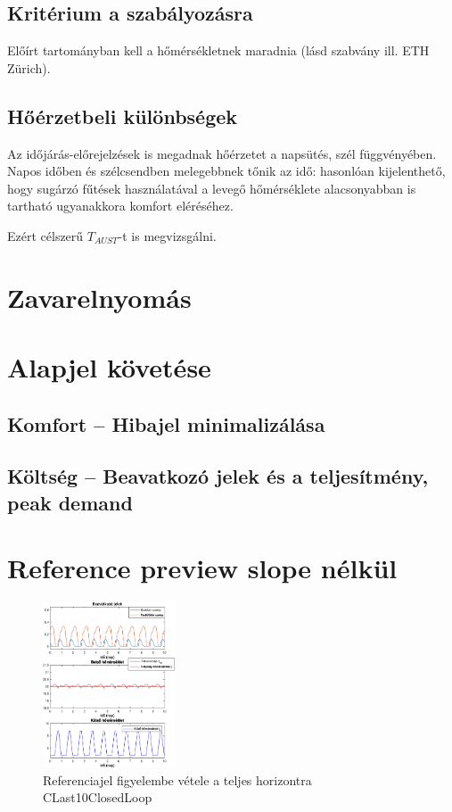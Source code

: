 \subsection{Kritérium a szabályozásra}
Előírt tartományban kell a hőmérsékletnek maradnia (lásd szabvány ill. ETH Zürich).

\subsection{Hőérzetbeli különbségek}
Az időjárás-előrejelzések is megadnak hőérzetet a napsütés, szél függvényében.
Napos időben és szélcsendben melegebbnek tőnik az idő: hasonlóan kijelenthető, hogy sugárzó fűtések használatával a levegő hőmérséklete alacsonyabban is tartható ugyanakkora komfort eléréséhez.

Ezért célszerű $T_{AUST}$-t is megvizsgálni.

\section{Zavarelnyomás}

\section{Alapjel követése}

\subsection{Komfort -- Hibajel minimalizálása}
\subsection{Költség -- Beavatkozó jelek és a teljesítmény, peak demand}

\section{Reference preview slope nélkül}

 
\begin{figure}[H]
	\centering
	\includegraphics[width=0.35\textwidth, trim=0 0 0 0, clip,]{figures/onlab/NoSlope/CLast10ClosedLoop}
	\caption{Referenciajel figyelembe vétele a teljes horizontra CLast10ClosedLoop}
	\label{fig:onlab-refprev1}
\end{figure}

